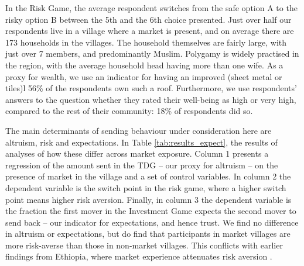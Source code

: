 In the Risk Game, the average respondent switches from the safe option A to the risky option B between the 5th and the 6th choice presented. Just over half our respondents live in a village where a market is present, and on average there are 173 households in the villages. The household themselves are fairly large, with just over 7 members, and predominantly Muslim. Polygamy is widely practised in the region, with the average household head having more than one wife. As a proxy for wealth, we use an indicator for having an improved (sheet metal or tiles)l 56\% of the respondents own such a roof. Furthermore, we use respondents' answers to the question whether they rated their well-being as high or very high, compared to the rest of their community: 18\% of respondents did so.


The main determinants of sending behaviour under consideration here are altruism, risk and expectations. In Table \ref{tab:results_expect}, the results of analyses of how these differ across market exposure. Column 1 presents a regression of the amount sent in the TDG -- our proxy for altruism -- on the presence of market in the village and a set of control variables. In column 2 the dependent variable is the switch point in the risk game, where a higher switch point means higher risk aversion. Finally, in column 3 the dependent variable is the fraction the first mover in the Investment Game expects the second mover to send back -- our indicator for expectations, and hence trust.  We find no difference in altruism or expectations, but do find that participants in market villages are more risk-averse than those in non-market villages. This conflicts with earlier findings from Ethiopia, where market experience attenuates risk aversion \citep{Melesse2015}.

\newcommand{\notes}{
		\footnotesize
		\item $t$ statistics in parentheses; $* p < 0.10, ** p < 0.05, *** p < 0.01$; Controls include: Village size, household size, religion, number of wives, and leadership position in the village
		\item
}

